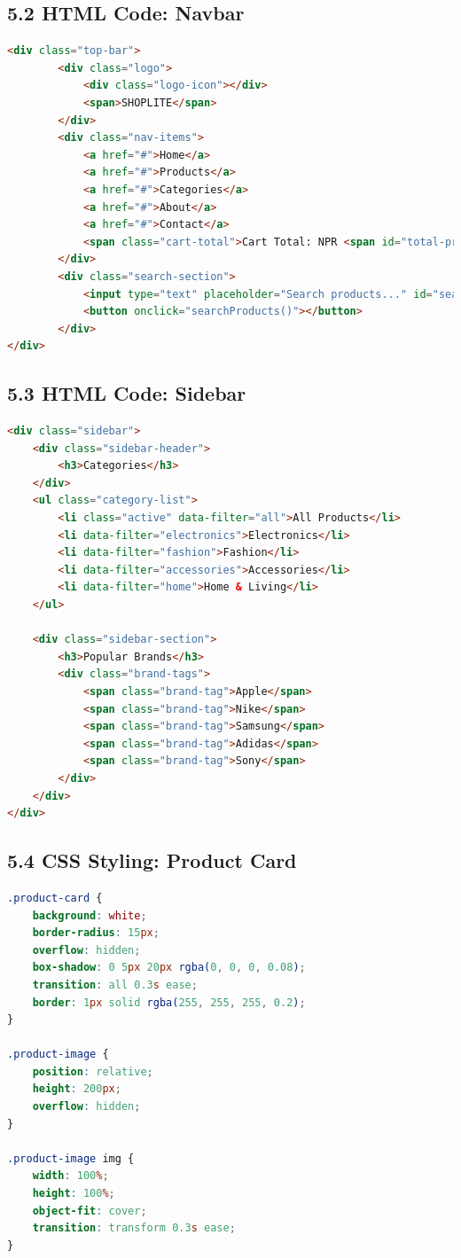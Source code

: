 \documentclass[a4paper,12pt]{article}
\begin{document}
\subsection*{5.2 HTML Code: Navbar }
\begin{lstlisting}[language=HTML]
<div class="top-bar">
        <div class="logo">
            <div class="logo-icon"></div>
            <span>SHOPLITE</span>
        </div>
        <div class="nav-items">
            <a href="#">Home</a>
            <a href="#">Products</a>
            <a href="#">Categories</a>
            <a href="#">About</a>
            <a href="#">Contact</a>
            <span class="cart-total">Cart Total: NPR <span id="total-price">0</span></span>
        </div>
        <div class="search-section">
            <input type="text" placeholder="Search products..." id="searchInput">
            <button onclick="searchProducts()"></button>
        </div>
</div>
\end{lstlisting}

\subsection*{5.3 HTML Code: Sidebar }
\begin{lstlisting}[language=HTML]
<div class="sidebar">
    <div class="sidebar-header">
        <h3>Categories</h3>
    </div>
    <ul class="category-list">
        <li class="active" data-filter="all">All Products</li>
        <li data-filter="electronics">Electronics</li>
        <li data-filter="fashion">Fashion</li>
        <li data-filter="accessories">Accessories</li>
        <li data-filter="home">Home & Living</li>
    </ul>

    <div class="sidebar-section">
        <h3>Popular Brands</h3>
        <div class="brand-tags">
            <span class="brand-tag">Apple</span>
            <span class="brand-tag">Nike</span>
            <span class="brand-tag">Samsung</span>
            <span class="brand-tag">Adidas</span>
            <span class="brand-tag">Sony</span>
        </div>
    </div>
</div>

\end{lstlisting}

\subsection*{5.4 CSS Styling: Product Card}

\begin{lstlisting}[language=CSS]
.product-card {
    background: white;
    border-radius: 15px;
    overflow: hidden;
    box-shadow: 0 5px 20px rgba(0, 0, 0, 0.08);
    transition: all 0.3s ease;
    border: 1px solid rgba(255, 255, 255, 0.2);
}

.product-image {
    position: relative;
    height: 200px;
    overflow: hidden;
}

.product-image img {
    width: 100%;
    height: 100%;
    object-fit: cover;
    transition: transform 0.3s ease;
}
\end{lstlisting}
\end{document}

